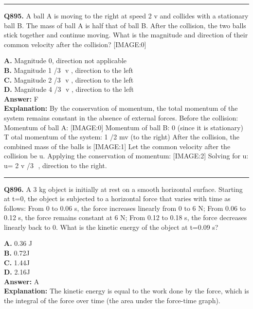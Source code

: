 \documentclass[12pt]{article}
\begin{document}
\hrule
\vspace{1em}


\noindent
\textbf{Q895.} A ball A is moving to the right at speed
2
v and collides with a stationary ball B. The mass of ball A is half that of ball B. After the collision, the two balls stick together and continue moving. What is the magnitude and direction of their common velocity after the collision?
[IMAGE:0]



\textbf{A.} Magnitude 0, direction not applicable \\
\textbf{B.} Magnitude 1
/3
​
v
, direction to the left \\
\textbf{C.} Magnitude 2
/3
​
v
, direction to the left \\
\textbf{D.} Magnitude 4
/3
​
v
, direction to the left \\

\textbf{Answer:} F \\
\textbf{Explanation:} By the conservation of momentum, the total momentum of the system remains constant in the absence of external forces. Before the collision:
\cdot 
Momentum of ball A:
[IMAGE:0]
\cdot 
Momentum of ball B: 0 (since it is stationary)
T
otal momentum of the system: 1
/2
​
mv (to the right)
After the collision, the combined mass of the balls is
[IMAGE:1]
Let the common velocity after the collision be u. Applying the conservation of momentum:
[IMAGE:2]
Solving for u: u=
2
v
/3
​
, direction to the right.

\hrule
\vspace{1em}


\noindent
\textbf{Q896.} A 3 kg object is initially at rest on a smooth horizontal surface. Starting at t=0, the object is subjected to a horizontal force that varies with time as follows:
From 0 to 0.06 s, the force increases linearly from 0 to 6 N;
From 0.06 to 0.12 s, the force remains constant at 6 N;
From 0.12 to 0.18 s, the force decreases linearly back to 0.
What is the kinetic energy of the object at t=0.09 s?



\textbf{A.} 0.36 J \\
\textbf{B.} 0.72J \\
\textbf{C.} 1.44J \\
\textbf{D.} 2.16J \\

\textbf{Answer:} A \\
\textbf{Explanation:} The kinetic energy is equal to the work done by the force, which is the integral of the force over time (the area under the force-time graph).
\end{document}
